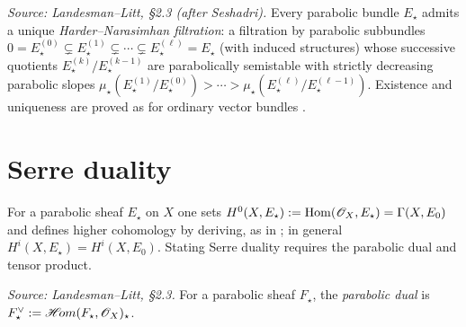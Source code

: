 \begin{definition}
  \label{def:parabolic-HN}
  \textit{Source: Landesman--Litt, \S2.3 (after Seshadri).}
  Every parabolic bundle $E_\star$ admits a unique \emph{Harder--Narasimhan
  filtration}: a filtration by parabolic subbundles
  $0 = E^{(0)}_\star \subsetneq E^{(1)}_\star \subsetneq \cdots \subsetneq
  E^{(\ell)}_\star = E_\star$ (with induced structures) whose successive
  quotients $E^{(k)}_\star / E^{(k-1)}_\star$ are parabolically semistable with
  strictly decreasing parabolic slopes
  $\mu_\star(E^{(1)}_\star/E^{(0)}_\star) > \cdots >
  \mu_\star(E^{(\ell)}_\star/E^{(\ell-1)}_\star)$. Existence and uniqueness are
  proved as for ordinary vector bundles \cite[Part 3, \S1.B, Theorem
  8]{seshadri:fibres-vectoriels-sur-les-courbes-algebriques}.
\end{definition}

\section{Serre duality}
\label{sec:serre-duality-parabolic}

For a parabolic sheaf $E_\star$ on $X$ one sets
$H^0(X, E_\star) := \operatorname{Hom}(\mathscr{O}_X, E_\star) = \Gamma(X, E_0)$ and defines higher
cohomology by deriving, as in \cite[p.~130]{yokogawa:infinitesimal-deformation};
in general $H^i(X, E_\star) = H^i(X, E_0)$. Stating Serre duality requires the
parabolic dual and tensor product.

\begin{definition}
  \label{def:parabolic-dual}
  \textit{Source: Landesman--Litt, \S2.3.}
  For a parabolic sheaf $F_\star$, the \emph{parabolic dual} is
  $F^\vee_\star := \mathop{\mathscr{H}\!om}(F_\star, \mathscr{O}_X)_\star$.
\end{definition}


